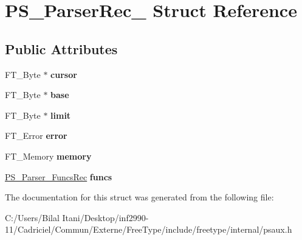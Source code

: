 \hypertarget{struct_p_s___parser_rec__}{}\section{P\+S\+\_\+\+Parser\+Rec\+\_\+ Struct Reference}
\label{struct_p_s___parser_rec__}
\subsection*{Public Attributes}
\begin{DoxyCompactItemize}
\item 
F\+T\+\_\+\+Byte $\ast$ {\bfseries cursor}\hypertarget{struct_p_s___parser_rec___a6ed189bc25c03814bdafad63819ddfe7}{}\label{struct_p_s___parser_rec___a6ed189bc25c03814bdafad63819ddfe7}

\item 
F\+T\+\_\+\+Byte $\ast$ {\bfseries base}\hypertarget{struct_p_s___parser_rec___a30528f6a9caffce2fd44ef2d5a38e5bd}{}\label{struct_p_s___parser_rec___a30528f6a9caffce2fd44ef2d5a38e5bd}

\item 
F\+T\+\_\+\+Byte $\ast$ {\bfseries limit}\hypertarget{struct_p_s___parser_rec___af3310795fd73530036fb32ec4385ea3d}{}\label{struct_p_s___parser_rec___af3310795fd73530036fb32ec4385ea3d}

\item 
F\+T\+\_\+\+Error {\bfseries error}\hypertarget{struct_p_s___parser_rec___a7a1432cb4d8bb603663f1258224c8ec4}{}\label{struct_p_s___parser_rec___a7a1432cb4d8bb603663f1258224c8ec4}

\item 
F\+T\+\_\+\+Memory {\bfseries memory}\hypertarget{struct_p_s___parser_rec___a3e2206deb6c0d73f51c8c71d5db1db1f}{}\label{struct_p_s___parser_rec___a3e2206deb6c0d73f51c8c71d5db1db1f}

\item 
\hyperlink{struct_p_s___parser___funcs_rec__}{P\+S\+\_\+\+Parser\+\_\+\+Funcs\+Rec} {\bfseries funcs}\hypertarget{struct_p_s___parser_rec___a450031fd9e77e55bf424dc64a8d2659d}{}\label{struct_p_s___parser_rec___a450031fd9e77e55bf424dc64a8d2659d}

\end{DoxyCompactItemize}


The documentation for this struct was generated from the following file\+:\begin{DoxyCompactItemize}
\item 
C\+:/\+Users/\+Bilal Itani/\+Desktop/inf2990-\/11/\+Cadriciel/\+Commun/\+Externe/\+Free\+Type/include/freetype/internal/psaux.\+h\end{DoxyCompactItemize}
